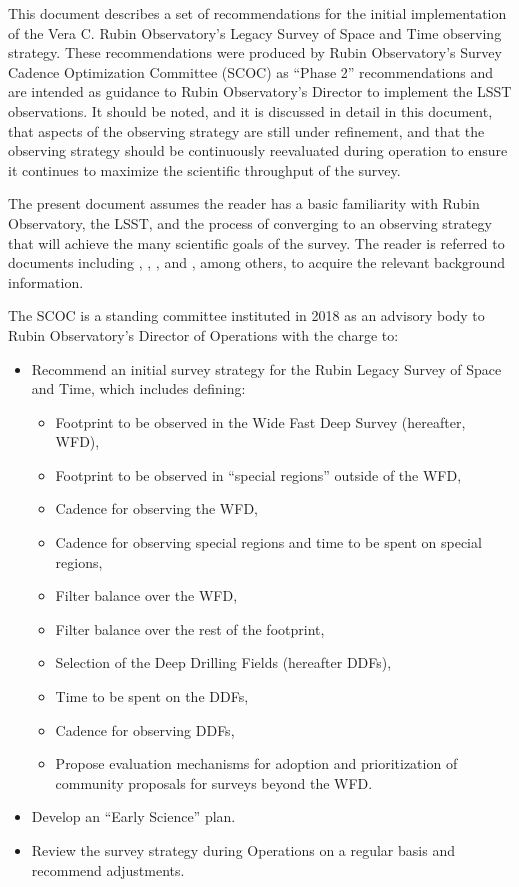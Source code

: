 This document describes a set of recommendations for the initial implementation of the Vera C. Rubin Observatory's Legacy Survey of Space and Time \citep[LSST;][]{2019ApJ...873..111I} observing strategy. These recommendations were produced by Rubin Observatory's Survey Cadence Optimization Committee (SCOC) as ``Phase 2'' recommendations and are intended as guidance to Rubin Observatory's Director to implement the LSST observations. It should be noted, and it is discussed in detail in this document, that aspects of the observing strategy are still under refinement, and that the observing strategy should be continuously reevaluated during operation to ensure it continues to maximize the scientific throughput of the survey.

The present document assumes the reader has a basic familiarity with Rubin Observatory, the LSST, and the process of converging to an observing strategy that will achieve the many scientific goals of the survey. The reader is referred to documents including , , , and \citet{2022ApJS..258....1B}, among others, to acquire the relevant background information.

The SCOC is a standing committee instituted in 2018 as an advisory body to Rubin Observatory's Director of Operations with the charge to:
\begin{itemize}
\item Recommend an initial survey strategy for the Rubin Legacy Survey of Space and Time, which includes defining:
\begin{itemize}
\item Footprint to be observed in the Wide Fast Deep Survey (hereafter, WFD),
\item Footprint to be observed in ``special regions'' outside of the WFD,
\item Cadence for observing the WFD,
\item Cadence for observing special regions and time to be spent on special regions,
\item Filter balance over the WFD,
\item Filter balance over the rest of the footprint,
\item Selection of the Deep Drilling Fields (hereafter DDFs),
\item Time to be spent on the DDFs,
\item Cadence for observing DDFs,
\item Propose evaluation mechanisms for adoption and prioritization of community proposals for surveys beyond the WFD.
\end{itemize}
\item Develop an ``Early Science'' plan.
\item Review the survey strategy during Operations on a regular basis and recommend adjustments.
\end{itemize}

